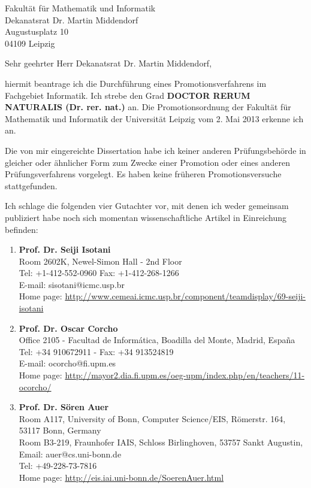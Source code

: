 \documentclass[DIN, pagenumber=false, parskip=half, fromalign=right, fromphone=true, fromemail=true, fromurl=false, fromlogo=false, fromrule=false, 11pt]{scrlttr2}
\begin{document}
\begin{letter}{Fakult\"at f\"ur Mathematik und Informatik \\ Dekanatsrat Dr. Martin Middendorf \\Augustusplatz 10 \\ 04109 Leipzig }


\opening{Sehr geehrter Herr Dekanatsrat Dr. Martin Middendorf,}

hiermit beantrage ich die Durchf\"uhrung eines Promotionsverfahrens im Fachgebiet Informatik. 
Ich strebe den Grad \textbf{DOCTOR RERUM NATURALIS (Dr. rer. nat.)} an.
Die Promotionsordnung der Fakult\"at f\"ur Mathematik und Informatik der Universit\"at Leipzig vom 2. Mai 2013 erkenne ich an.

Die von mir eingereichte Dissertation habe ich keiner anderen Pr{\"u}fungsbeh{\"o}rde in gleicher oder \"ahnlicher Form zum Zwecke einer Promotion oder eines anderen Pr\"ufungsverfahrens vorgelegt.
Es haben keine fr\"uheren Promotionsversuche stattgefunden.

Ich schlage die folgenden vier Gutachter vor, mit denen ich weder gemeinsam publiziert habe noch sich momentan wissenschaftliche Artikel in Einreichung befinden:

\begin{enumerate}

\item \textbf{Prof. Dr. Seiji Isotani} \\
Room 2602K, Newel-Simon Hall - 2nd Floor \\
Tel: +1-412-552-0960 Fax: +1-412-268-1266 \\
E-mail: sisotani@icmc.usp.br \\
Home page: \url{http://www.cemeai.icmc.usp.br/component/teamdisplay/69-seiji-isotani}

\item \textbf{Prof. Dr. Oscar Corcho} \\
Office 2105 - Facultad de Informática, Boadilla del Monte, Madrid, España \\
Tel: +34 910672911 - Fax: +34 913524819 \\
E-mail: ocorcho@fi.upm.es \\
Home page: \url{http://mayor2.dia.fi.upm.es/oeg-upm/index.php/en/teachers/11-ocorcho/}

\item  \textbf{Prof. Dr. Sören Auer} \\
Room A117, University of Bonn, Computer Science/EIS, Römerstr. 164, 53117 Bonn, Germany \\
Room B3-219, Fraunhofer IAIS, Schloss Birlinghoven, 53757 Sankt Augustin, \\
Email: auer@cs.uni-bonn.de\\
Tel: +49-228-73-7816\\
Home page: \url{http://eis.iai.uni-bonn.de/SoerenAuer.html}


\end{enumerate}
\end{letter}
\end{document}
